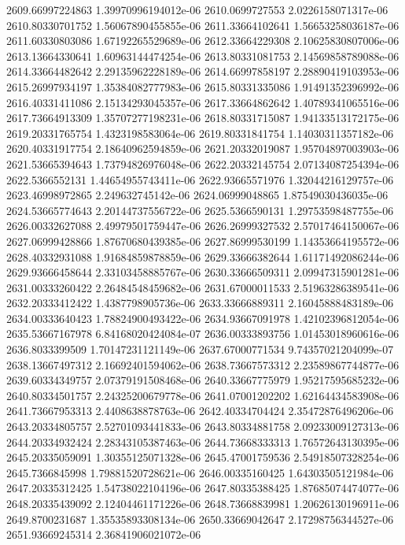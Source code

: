 {2609.66997224863 1.39970996194012e-06
2610.0699727553 2.0226158071317e-06
2610.80330701752 1.56067890455855e-06
2611.33664102641 1.56653258036187e-06
2611.60330803086 1.67192265529689e-06
2612.33664229308 2.10625830807006e-06
2613.13664330641 1.60963144474254e-06
2613.80331081753 2.14569858789088e-06
2614.33664482642 2.29135962228189e-06
2614.66997858197 2.28890419103953e-06
2615.26997934197 1.35384082777983e-06
2615.80331335086 1.91491352396992e-06
2616.40331411086 2.15134293045357e-06
2617.33664862642 1.40789341065516e-06
2617.73664913309 1.35707277198231e-06
2618.80331715087 1.94133513172175e-06
2619.20331765754 1.4323198583064e-06
2619.80331841754 1.14030311357182e-06
2620.40331917754 2.18640962594859e-06
2621.20332019087 1.95704897003903e-06
2621.53665394643 1.73794826976048e-06
2622.20332145754 2.07134087254394e-06
2622.5366552131 1.44654955743411e-06
2622.93665571976 1.32044216129757e-06
2623.46998972865 2.249632745142e-06
2624.06999048865 1.87549030436035e-06
2624.53665774643 2.20144737556722e-06
2625.5366590131 1.29753598487755e-06
2626.00332627088 2.49979501759447e-06
2626.26999327532 2.57017464150067e-06
2627.06999428866 1.87670680439385e-06
2627.86999530199 1.14353664195572e-06
2628.40332931088 1.91684859878859e-06
2629.33666382644 1.61171492086244e-06
2629.93666458644 2.33103458885767e-06
2630.33666509311 2.09947315901281e-06
2631.00333260422 2.26484548459682e-06
2631.67000011533 2.51963286389541e-06
2632.20333412422 1.4387798905736e-06
2633.33666889311 2.16045888483189e-06
2634.00333640423 1.78824900493422e-06
2634.93667091978 1.42102396812054e-06
2635.53667167978 6.84168020424084e-07
2636.00333893756 1.01453018960616e-06
2636.8033399509 1.70147231121149e-06
2637.67000771534 9.74357021204099e-07
2638.13667497312 2.16692401594062e-06
2638.73667573312 2.23589867744877e-06
2639.60334349757 2.07379191508468e-06
2640.33667775979 1.95217595685232e-06
2640.80334501757 2.24325200679778e-06
2641.07001202202 1.62164434583908e-06
2641.73667953313 2.4408638878763e-06
2642.40334704424 2.35472876496206e-06
2643.20334805757 2.52701093441833e-06
2643.80334881758 2.09233009127313e-06
2644.20334932424 2.28343105387463e-06
2644.73668333313 1.76572643130395e-06
2645.20335059091 1.30355125071328e-06
2645.47001759536 2.54918507328254e-06
2645.7366845998 1.79881520728621e-06
2646.00335160425 1.64303505121984e-06
2647.20335312425 1.54738022104196e-06
2647.80335388425 1.87685074474077e-06
2648.20335439092 2.12404461171226e-06
2648.73668839981 1.20626130196911e-06
2649.8700231687 1.35535893308134e-06
2650.33669042647 2.17298756344527e-06
2651.93669245314 2.36841906021072e-06
}
